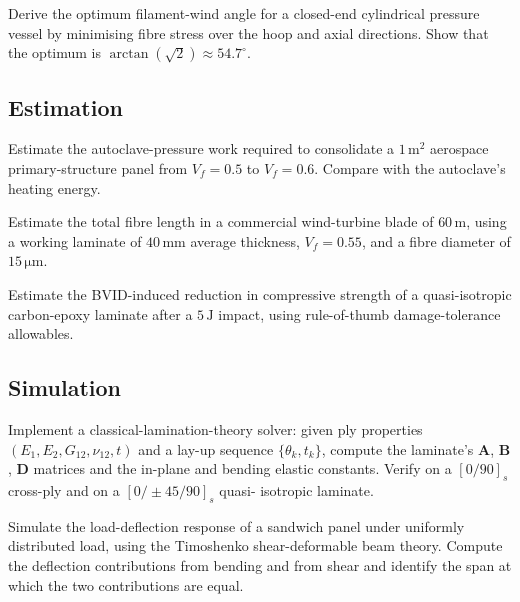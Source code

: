 \begin{exercise}
Derive the optimum filament-wind angle for a closed-end cylindrical
pressure vessel by minimising fibre stress over the hoop and axial
directions. Show that the optimum is $\arctan(\sqrt{2}) \approx
54.7^\circ$.
\end{exercise}

\subsection*{Estimation}

\begin{exercise}
Estimate the autoclave-pressure work required to consolidate a
$1\,\text{m}^2$ aerospace primary-structure panel from $V_f = 0.5$ to
$V_f = 0.6$. Compare with the autoclave's heating energy.
\end{exercise}

\begin{exercise}
Estimate the total fibre length in a commercial wind-turbine blade of
$60\,\text{m}$, using a working laminate of $40\,\text{mm}$ average
thickness, $V_f = 0.55$, and a fibre diameter of $15\,\si{\micro\meter}$.
\end{exercise}

\begin{exercise}
Estimate the BVID-induced reduction in compressive strength of a
quasi-isotropic carbon-epoxy laminate after a $5\,\text{J}$ impact,
using rule-of-thumb damage-tolerance allowables.
\end{exercise}

\subsection*{Simulation}

\begin{exercise}
Implement a classical-lamination-theory solver: given ply properties
$(E_1, E_2, G_{12}, \nu_{12}, t)$ and a lay-up sequence
$\{\theta_k, t_k\}$, compute the laminate's $\mathbf{A}$, $\mathbf{B}$,
$\mathbf{D}$ matrices and the in-plane and bending elastic constants.
Verify on a $[0/90]_s$ cross-ply and on a $[0/\pm 45/90]_s$ quasi-
isotropic laminate.
\end{exercise}

\begin{exercise}
Simulate the load-deflection response of a sandwich panel under
uniformly distributed load, using the Timoshenko shear-deformable beam
theory. Compute the deflection contributions from bending and from
shear and identify the span at which the two contributions are equal.
\end{exercise}

